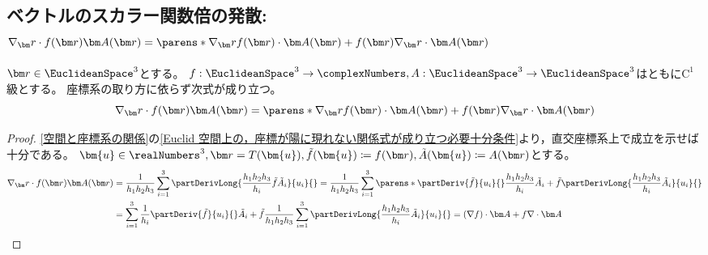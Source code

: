         \subsection{ベクトルのスカラー関数倍の発散\texorpdfstring{: $\nabla_\vr\cdot f(\vr)\vA(\vr) = \parens*{\nabla_\vr f(\vr)}\cdot \vA(\vr) + f(\vr)\nabla_\vr\cdot\vA(\vr)$}{}}
            \begin{shadebox}
                $\vr\in\EuclideanSpace^3$とする。
                $f:\EuclideanSpace^3\to\complexNumbers,A:\EuclideanSpace^3\to\EuclideanSpace^3$はともに$\mathrm{C}^1$級とする。
                座標系の取り方に依らず次式が成り立つ。
                \[ \nabla_\vr\cdot f(\vr)\vA(\vr) = \parens*{\nabla_\vr f(\vr)}\cdot \vA(\vr) + f(\vr)\nabla_\vr\cdot\vA(\vr) \]
            \end{shadebox}
            \begin{proof}
                \ref{空間と座標系の関係}の\ref{Euclid 空間上の，座標が陽に現れない関係式が成り立つ必要十分条件}より，直交座標系上で成立を示せば十分である。
                $\bm{u}\in\realNumbers^3,\vr=T(\bm{u}),\tilde{f}(\bm{u})\coloneq f(\vr),\tilde{A}(\bm{u})\coloneq A(\vr)$とする。
                \begin{align*}
                    \nabla_\vr\cdot f(\vr)\vA(\vr) &= \frac{1}{h_1 h_2 h_3}\sum_{i=1}^3 \partDerivLong{\frac{h_1 h_2 h_3}{h_i}\tilde{f} \tilde{A}_i}{u_i}{} = \frac{1}{h_1 h_2 h_3}\sum_{i=1}^3\parens*{\partDeriv{\tilde{f}}{u_i}{}\frac{h_1 h_2 h_3}{h_i} \tilde{A}_i + \tilde{f}\partDerivLong{\frac{h_1 h_2 h_3}{h_i} \tilde{A}_i}{u_i}{}} \\
                    &= \sum_{i=1}^3 \frac{1}{h_i}\partDeriv{\tilde{f}}{u_i}{}\tilde{A}_i + \tilde{f}\frac{1}{h_1 h_2 h_3}\sum_{i=1}^3 \partDerivLong{\frac{h_1 h_2 h_3}{h_i}\tilde{A}_i}{u_i}{} = (\nabla f)\cdot\vA + f\nabla\cdot\vA
                \end{align*}
            \end{proof}
